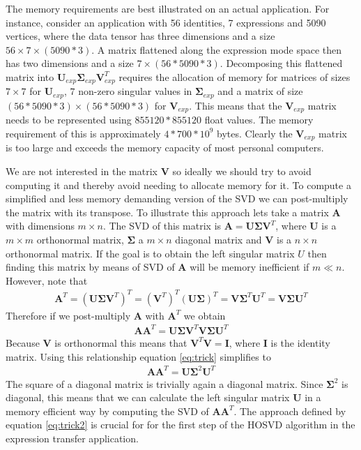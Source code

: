 \documentclass[11pt,a4paper]{report}
\begin{document}
The memory requirements are best illustrated on an actual application. For
instance, consider an application with 56 identities, 7 expressions
and 5090 vertices, where the data tensor has three dimensions and a size $56\times
7\times (5090*3)$. A
matrix flattened along the expression mode space then has two dimensions and a size
$7 \times (56*5090*3)$.  Decomposing this flattened matrix into
$\mathbf{U}_{exp} \mathbf{\Sigma}_{exp} \mathbf{V}_{exp}^T$ requires the
allocation of memory for matrices of sizes
$7\times 7$ for $\mathbf{U}_{exp}$, $7$ non-zero singular values in $\mathbf{\Sigma}_{exp}$ and a matrix of size
$(56*5090*3)\times (56*5090*3)$ for $\mathbf{V}_{exp}$. This means that the
$\mathbf{V}_{exp}$ matrix needs to be represented using $855120*855120$ float values. The memory requirement of this is approximately $4*700*10^9$
bytes. Clearly the $\mathbf{V}_{exp}$ matrix is too large and exceeds the memory capacity of
most personal computers.

We are not interested in the matrix $\mathbf{V}$ so ideally we should try to
avoid computing it and thereby avoid needing to allocate memory for it. To compute a simplified and less memory demanding version of the SVD we can
post-multiply the matrix with its transpose. To illustrate this approach lets
take a matrix $\mathbf{A}$ with dimensions $m \times n$. The SVD of this matrix
is $\mathbf{A} = \mathbf{U\Sigma V}^T$, where $\mathbf{U}$ is a $m \times m$
orthonormal matrix, $\mathbf{\Sigma}$ a $m \times n$ diagonal matrix and $\mathbf{V}$ is a $n \times n$
orthonormal matrix. If the goal is to obtain
the left singular matrix $U$ then finding this matrix by means of SVD of
$\mathbf{A}$ will be memory inefficient if $m \ll n$. However, note that 
\begin{align}
\mathbf{A}^T = (\mathbf{U\Sigma V}^T)^T = (\mathbf{V}^T)^T(\mathbf{U\Sigma})^T
= \mathbf{V}\mathbf{\Sigma}^T\mathbf{U}^T = \mathbf{V\Sigma U}^T 
\end{align}
Therefore if we post-multiply $\mathbf{A}$ with $\mathbf{A}^T$ we obtain
\begin{align}\label{eq:trick}
\mathbf{A}\mathbf{A}^T = \mathbf{U\Sigma V}^T\mathbf{V\Sigma U}^T
\end{align}
Because $\mathbf{V}$ is orthonormal this means that $\mathbf{V}^T\mathbf{V} =
\mathbf{I}$, where $\mathbf{I}$ is the identity matrix. Using this relationship
equation \ref{eq:trick} simplifies to
\begin{align}\label{eq:trick2}
\mathbf{A}\mathbf{A}^T = \mathbf{U\Sigma}^2 \mathbf{U}^T
\end{align}
The square of a diagonal matrix is trivially again a diagonal matrix. Since
$\mathbf{\Sigma}^2$ is diagonal, this means that we can calculate the left
singular matrix $\mathbf{U}$ in a memory efficient way by computing the SVD
of $\mathbf{A}\mathbf{A}^T$. The approach defined by equation \ref{eq:trick2} is
crucial for for the first step of the HOSVD algorithm in the expression transfer
application.
\end{document}
